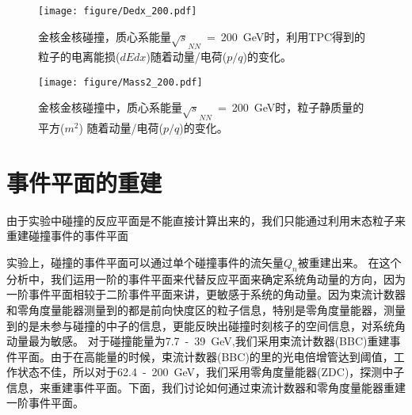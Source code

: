 \begin{figure}[htbp]
\centering
\texttt{[image: figure/Dedx\_200.pdf]}
\caption{金核金核碰撞，质心系能量$\sqrt{s}_{NN}$~=~200~GeV时，利用TPC得到的粒子的电离能损($dEdx$)随着动量/电荷($p/q$)的变化。}
\label{fig:Dedx_200}
\end{figure}

\begin{figure}[htbp]
\centering
\texttt{[image: figure/Mass2\_200.pdf]}
\caption{金核金核碰撞中，质心系能量$\sqrt{s}_{NN}$~=~200~GeV时，粒子静质量的平方($m^{2}$) 随着动量/电荷($p/q$)的变化。}
\label{fig:Mass2_200}
\end{figure}

\vspace{0.2in}

\bigskip


\vspace{0.2in}




\section{事件平面的重建}

由于实验中碰撞的反应平面是不能直接计算出来的，我们只能通过利用末态粒子来重建碰撞事件的事件平面

实验上，碰撞的事件平面可以通过单个碰撞事件的流矢量$Q_{n}$被重建出来。
在这个分析中，我们运用一阶的事件平面来代替反应平面来确定系统角动量的方向，因为一阶事件平面相较于二阶事件平面来讲，更敏感于系统的角动量。因为束流计数器和零角度量能器测量到的都是前向快度区的粒子信息，特别是零角度量能器，测量到的是未参与碰撞的中子的信息，更能反映出碰撞时刻核子的空间信息，对系统角动量最为敏感。
对于碰撞能量为7.7~-~39~GeV,我们采用束流计数器(BBC)重建事件平面。由于在高能量的时候，束流计数器(BBC)的里的光电倍增管达到阈值，工作状态不佳，所以对于62.4~-~200~GeV，我们采用零角度量能器(ZDC)，探测中子信息，来重建事件平面。下面，我们讨论如何通过束流计数器和零角度量能器重建一阶事件平面。

